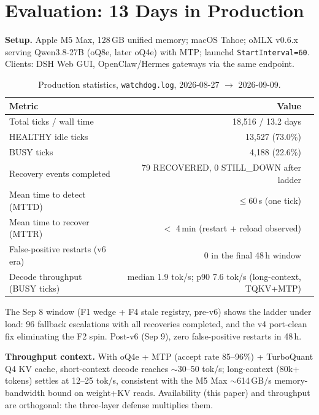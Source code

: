 \documentclass[10pt]{article}
\begin{document}
\section{Evaluation: 13 Days in Production}\label{sec:eval}

\noindent\textbf{Setup.} Apple M5 Max, 128\,GB unified memory; macOS Tahoe; oMLX v0.6.x serving Qwen3.8-27B (oQ8e, later oQ4e) with MTP; launchd \texttt{StartInterval=60}. Clients: DSH Web GUI, OpenClaw/Hermes gateways via the same endpoint.

\begin{table}[t]\centering
\small
\renewcommand{\arraystretch}{1.3}
\begin{tabular}{@{}lrr@{}}
\toprule
Metric & Value \\
\midrule
Total ticks / wall time          & 18{,}516 / 13.2 days \\
HEALTHY idle ticks               & 13{,}527 (73.0\%) \\
BUSY ticks                       & 4{,}188 (22.6\%) \\
Recovery events completed        & 79 RECOVERED, 0 STILL\_DOWN after ladder \\
Mean time to detect (MTTD)       & $\le 60$\,s (one tick) \\
Mean time to recover (MTTR)      & $<$ 4\,min (restart + reload observed) \\
False-positive restarts (v6 era) & 0 in the final 48\,h window \\
Decode throughput (BUSY ticks)   & median 1.9 tok/s; p90 7.6 tok/s (long-context, TQKV+MTP) \\
\bottomrule
\end{tabular}
\caption{Production statistics, \texttt{watchdog.log}, 2026-08-27 $\rightarrow$ 2026-09-09.}
\label{tab:eval}
\end{table}

The Sep 8 window (F1 wedge + F4 stale registry, pre-v6) shows the ladder under load: 96 fallback escalations with all recoveries completed, and the v4 port-clean fix eliminating the F2 spin. Post-v6 (Sep 9), zero false-positive restarts in 48\,h.

\noindent\textbf{Throughput context.} With oQ4e + MTP (accept rate 85--96\%) + TurboQuant Q4 KV cache, short-context decode reaches $\sim$30--50 tok/s; long-context (80k+ tokens) settles at 12--25 tok/s, consistent with the M5 Max $\sim$614\,GB/s memory-bandwidth bound on weight+KV reads. Availability (this paper) and throughput are orthogonal: the three-layer defense multiplies them.
\end{document}
